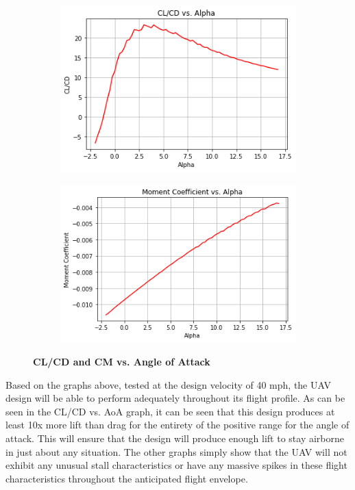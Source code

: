     \begin{figure}[h]
        \centering
        \begin{subfigure}{.5\textwidth}
          \centering
          \includegraphics[width=1\linewidth]{homeworks/homework4/analysis/CLCD vs AoA.png}
          \label{fig:CL/CD vs. AoA}
        \end{subfigure}%
        \begin{subfigure}{.5\textwidth}
          \centering
          \includegraphics[width=1\linewidth]{homeworks/homework4/analysis/CM vs AoA.png}
          \label{fig: CM vs. AoA}
        \end{subfigure}
        \caption{\textbf{CL/CD and CM vs. Angle of Attack}}
    \end{figure}

    Based on the graphs above, tested at the design velocity of 40 mph, the UAV design will be able to perform adequately throughout its flight profile. As can be seen in the CL/CD vs. AoA graph, it can be seen that this design produces at least 10x more lift than drag for the entirety of the positive range for the angle of attack. This will ensure that the design will produce enough lift to stay airborne in just about any situation. The other graphs simply show that the UAV will not exhibit any unusual stall characteristics or have any massive spikes in these flight characteristics throughout the anticipated flight envelope.

